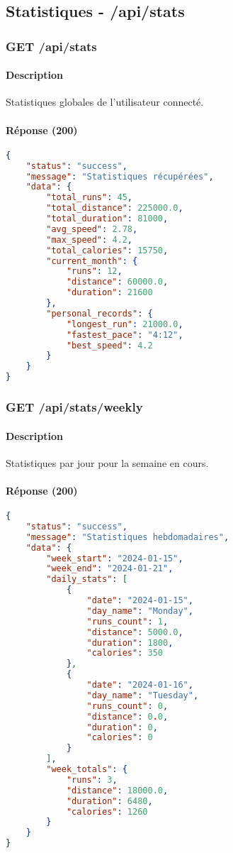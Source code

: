 \subsection{Statistiques - /api/stats}

\subsubsection{GET /api/stats}

\paragraph{Description}
Statistiques globales de l'utilisateur connecté.

\paragraph{Réponse (200)}
\begin{lstlisting}[language=json]
{
    "status": "success",
    "message": "Statistiques récupérées",
    "data": {
        "total_runs": 45,
        "total_distance": 225000.0,
        "total_duration": 81000,
        "avg_speed": 2.78,
        "max_speed": 4.2,
        "total_calories": 15750,
        "current_month": {
            "runs": 12,
            "distance": 60000.0,
            "duration": 21600
        },
        "personal_records": {
            "longest_run": 21000.0,
            "fastest_pace": "4:12",
            "best_speed": 4.2
        }
    }
}
\end{lstlisting}

\subsubsection{GET /api/stats/weekly}

\paragraph{Description}
Statistiques par jour pour la semaine en cours.

\paragraph{Réponse (200)}
\begin{lstlisting}[language=json]
{
    "status": "success",
    "message": "Statistiques hebdomadaires",
    "data": {
        "week_start": "2024-01-15",
        "week_end": "2024-01-21",
        "daily_stats": [
            {
                "date": "2024-01-15",
                "day_name": "Monday",
                "runs_count": 1,
                "distance": 5000.0,
                "duration": 1800,
                "calories": 350
            },
            {
                "date": "2024-01-16",
                "day_name": "Tuesday",
                "runs_count": 0,
                "distance": 0.0,
                "duration": 0,
                "calories": 0
            }
        ],
        "week_totals": {
            "runs": 3,
            "distance": 18000.0,
            "duration": 6480,
            "calories": 1260
        }
    }
}
\end{lstlisting}

